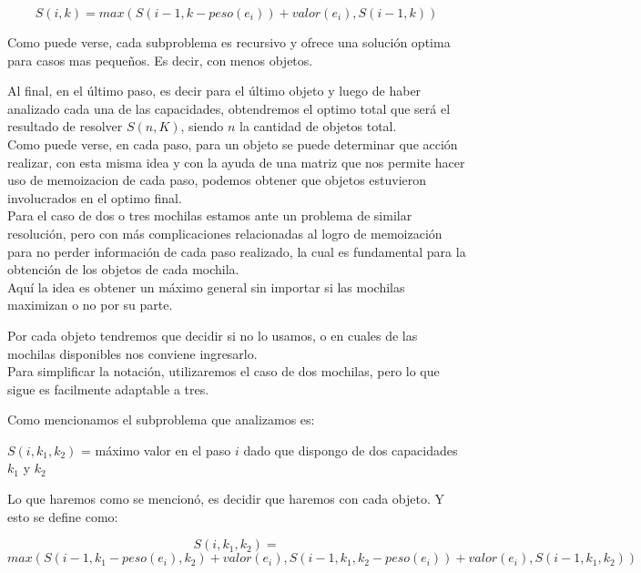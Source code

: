 \begin{equation}
S(i, k) = max(S(i-1, k-peso(e_i))+valor(e_i), S(i-1, k))
\end{equation}

Como puede verse, cada subproblema es recursivo y ofrece una solución optima para casos mas pequeños. Es decir, con menos objetos.

Al final, en el último paso, es decir para el último objeto y luego de haber analizado cada una de las capacidades, obtendremos el optimo total que será el resultado de resolver $S(n, K)$, siendo $n$ la cantidad de objetos total.\\

Como puede verse, en cada paso, para un objeto se puede determinar que acción realizar, con esta misma idea y con la ayuda de una matriz que nos permite hacer uso de memoizacion de cada paso, podemos obtener que objetos estuvieron involucrados en el optimo final.\\

Para el caso de dos o tres mochilas estamos ante un problema de similar resolución, pero con más complicaciones relacionadas al logro de memoización para no perder información de cada paso realizado, la cual es fundamental para la obtención de los objetos de cada mochila.\\

Aquí la idea es obtener un máximo general sin importar si las mochilas maximizan o no por su parte.

Por cada objeto tendremos que decidir si no lo usamos, o en cuales de las mochilas disponibles nos conviene ingresarlo.\\
Para simplificar la notación, utilizaremos el caso de dos mochilas, pero lo que sigue es facilmente adaptable a tres.

Como mencionamos el subproblema que analizamos es:

\begin{center}
$S(i, k_1, k_2)$ = máximo valor en el paso $i$ dado que dispongo de dos capacidades $k_1$ y $k_2$
\end{center}

Lo que haremos como se mencionó, es decidir que haremos con cada objeto. Y esto se define como:

\begin{equation}
S(i, k_1, k_2) = 
\end{equation}
\begin{equation}
max(S(i-1, k_1-peso(e_i), k_2)+valor(e_i), 
        S(i-1, k_1, k_2-peso(e_i))+valor(e_i), 
        S(i-1, k_1, k_2))
\end{equation}

